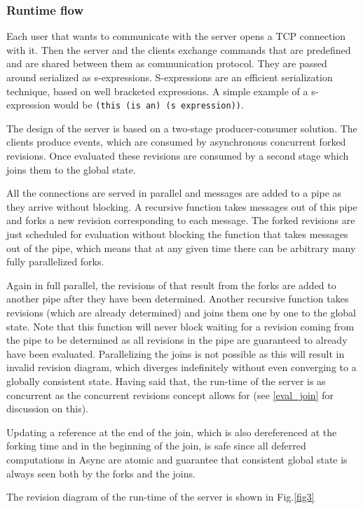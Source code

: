 \documentclass[12pt,twoside,notitlepage]{report}
\begin{document}
{\subsubsection{Runtime flow}
Each user that wants to communicate with the server opens a TCP connection with it. Then the server and the clients exchange commands that are predefined and are shared between them as communication protocol. They are passed around serialized as s-expressions. S-expressions are an efficient serialization technique, based on well bracketed expressions. A simple example of a s-expression would be {\tt (this (is an) (s expression))}. 

The design of the server is based on a two-stage producer-consumer solution. The clients produce events, which are consumed by asynchronous concurrent forked revisions. Once evaluated these revisions are consumed by a second stage which joins them to the global state. 

All the connections are served in parallel and messages are added to a pipe as they arrive without blocking. A recursive function takes messages out of this pipe and forks a new revision corresponding to each message. The forked revisions are just scheduled for evaluation without blocking the function that takes messages out of the pipe, which means that at any given time there can be arbitrary many fully parallelized forks. 

Again in full parallel, the revisions of that result from the forks are added to another pipe after they have been determined. Another recursive function takes revisions (which are already determined) and joins them one by one to the global state. Note that this function will never block waiting for a revision coming from the pipe to be determined as all revisions in the pipe are guaranteed to already have been evaluated. Parallelizing the joins is not possible as this will result in invalid revision diagram, which diverges indefinitely without even converging to a globally consistent state. Having said that, the run-time of the server is as concurrent as the concurrent revisions concept allows for (see \ref{eval_join} for discussion on this).

Updating a reference at the end of the join, which is also dereferenced at the forking time and in the beginning of the join, is safe since all deferred computations in Async are atomic and guarantee that consistent global state is always seen both by the forks and the joins. 

The revision diagram of the run-time of the server is shown in Fig.\ref{fig3}

}
\end{document}
